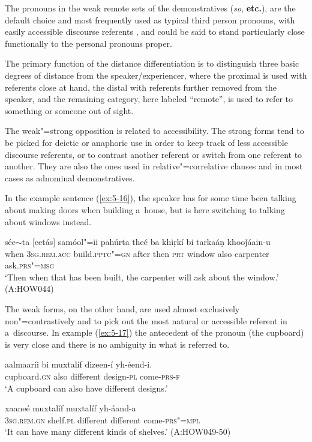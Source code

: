 The pronouns in the weak remote sets of the demonstratives (\textit{so}, \textbf{etc.}), are the default choice and most frequently used as typical third person pronouns, with easily accessible discourse referents \citep[432--433]{diessel2006}, and could be said to stand particularly close functionally to the personal pronouns proper. 

The primary function of the distance differentiation is to distinguish three basic degrees of distance from the speaker/experiencer, where the proximal is used with referents close at hand, the distal with referents further removed from the speaker, and the remaining category, here labeled ``remote'', is used to refer to something or someone out of sight. 


The weak"=strong opposition is related to accessibility. The strong forms tend to be picked for deictic or anaphoric use in order to keep track of less accessible discourse referents, or to contrast another referent or switch from one referent to another. They are also the ones used in relative"=correlative clauses and in most cases as adnominal demonstratives. 


In the example sentence (\ref{ex:5-16}), the speaker has for some time been talking about making doors when building a~house, but is here switching to talking about windows instead.


\begin{exe}
\ex
\label{ex:5-16}
\gll sée$\sim$ta [eetás] samóol"=ii pahúrta theé ba khiṛkí bi tarkaáṇ
khooǰáain-u  \\
when \textsc{3sg}.\textsc{rem.acc} build.\textsc{pptc"=gn} after then \textsc{prt} window also carpenter ask.\textsc{prs"=msg} \\
\glt `Then when that has been built, the carpenter will ask about the window.' (A:HOW044)
\end{exe}

The weak forms, on the other hand, are used almost exclusively non"=contrastively and to pick out the
most natural or accessible referent in a~discourse. In example (\ref{ex:5-17}) the antecedent of the pronoun
(the cupboard) is very close and there is no ambiguity in what is referred to.

\begin{exe}
\ex
\label{ex:5-17}
\gll aalmaaríi bi muxtalíf dizeen-í yh-éend-i. \\
cupboard.\textsc{gn} also different design-\textsc{pl} come-\textsc{prs-f} \\
\glt `A cupboard can also have different designs.' 

\gll [tasíi] xaaneé muxtalíf muxtalíf yh-áand-a \\
\textsc{3sg}.\textsc{rem.gn} shelf.\textsc{pl} different different come-\textsc{prs"=mpl} \\
\glt `It can have many different kinds of shelves.' (A:HOW049-50)
\end{exe}

